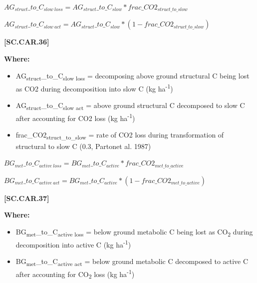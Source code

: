     \begin{center}
\(AG_{struct}\_to\_C_{slow\ loss}=AG_{struct}\_to\_C_{slow} * frac\_CO2_{struct\_to\_slow}\)
\vspace{0.1cm}

\(AG_{struct}\_to\_C_{slow\ act}=AG_{struct}\_to\_C_{slow} * (1-frac\_CO2_{struct\_to\_slow})\)

    \end{center}
        \vspace{0.5cm} 
    
            {\raggedleft \textbf{[SC.CAR.36]}\par}
            \vspace{0.5cm}

        \textbf{Where:}
            
        \begin{itemize}
            \item AG\textsubscript{struct}\_to\_C\textsubscript{slow loss} = decomposing above ground structural C being lost as CO2 during decomposition into slow C (kg ha\textsuperscript{-1})
            \item AG\textsubscript{struct}\_to\_C\textsubscript{slow act}  = above ground structural C decomposed to slow C after accounting for CO2 loss (kg ha\textsuperscript{-1})
            \item frac\_CO2\textsubscript{struct\_to\_slow} = rate of CO2 loss during transformation of structural to slow C (0.3, Partonet al. 1987)
        \end{itemize}
        \vspace{0.5cm}

    \begin{center}
\(BG_{met}\_to\_C_{active\ loss}=BG_{met}\_to\_C_{active} * frac\_CO2_{met\_to\_active}\)
\vspace{0.1cm}

\(BG_{met}\_to\_C_{active\ act}=BG_{met}\_to\_C_{active} * (1-frac\_CO2_{met\_to\_active})\)

    \end{center}
        \vspace{0.5cm} 
    
            {\raggedleft \textbf{[SC.CAR.37]}\par}
            \vspace{0.5cm}

        \textbf{Where:}
            
        \begin{itemize}
            \item BG\textsubscript{met}\_to\_C\textsubscript{active loss} = below ground metabolic C being lost as CO\textsubscript{2} during decomposition into active C (kg ha\textsuperscript{-1})
            \item BG\textsubscript{met}\_to\_C\textsubscript{active act} = below ground metabolic C decomposed to active C after accounting for CO\textsubscript{2} loss (kg ha\textsuperscript{-1})
        \end{itemize}
        \vspace{0.5cm}

